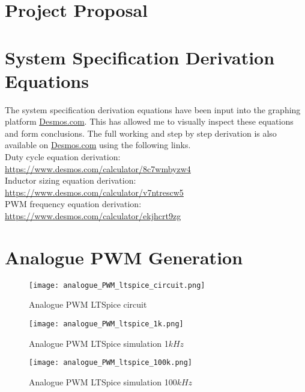 \chapter{Project Proposal}\label{A:proposal}




\chapter{System Specification Derivation Equations} \label{A:specs}

The system specification derivation equations have been input into the graphing platform \url{Desmos.com}. This has allowed me to visually inspect these equations and form conclusions. The full working and step by step derivation is also available on \url{Desmos.com} using the following links.\\

Duty cycle equation derivation:\\
\url{https://www.desmos.com/calculator/8c7wmbyzw4}\\

Inductor sizing equation derivation:\\ 
\url{https://www.desmos.com/calculator/v7ntrescw5}\\

PWM frequency equation derivation:\\ 
\url{https://www.desmos.com/calculator/ekjhcrt9zg}\\

\chapter{Analogue PWM Generation} \label{A:analogue_PWM}


\begin{figure}[H]
    \texttt{[image: analogue\_PWM\_ltspice\_circuit.png]}
    \caption{Analogue PWM LTSpice circuit}
\end{figure}

\begin{figure}[H]
    \texttt{[image: analogue\_PWM\_ltspice\_1k.png]}
    \caption{Analogue PWM LTSpice simulation 1$kHz$}
\end{figure}

\begin{figure}[H]
    \texttt{[image: analogue\_PWM\_ltspice\_100k.png]}
    \caption{Analogue PWM LTSpice simulation 100$kHz$}
\end{figure}


